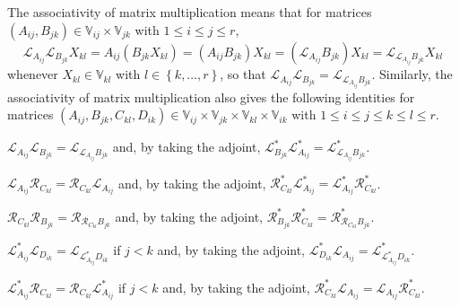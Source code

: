 \documentclass[oneside]{amsart}
\theoremstyle{plain}
\theoremstyle{definition}
\theoremstyle{remark}
\numberwithin{equation}{section}
\begin{document}
The associativity of matrix multiplication means that for matrices
$(A_{ij}, B_{jk}) \in \mathbb{V}_{ij} \times \mathbb{V}_{jk}$ with $1 \leq
i \leq j \leq r$,
\[
\mathcal{L}_{A_{ij}} \mathcal{L}_{B_{jk}} X_{kl} = A_{ij} (B_{jk} X_{kl}) =
(A_{ij} B_{jk}) X_{kl} = (\mathcal{L}_{A_{ij}} B_{jk}) X_{kl} =
\mathcal{L}_{\mathcal{L}_{A_{ij}} B_{jk}} X_{kl}
\]
whenever $X_{kl} \in \mathbb{V}_{kl}$ with $l \in \left\{k, \dotsc,
r\right\}$, so that $\mathcal{L}_{A_{ij}} \mathcal{L}_{B_{jk}} =
\mathcal{L}_{\mathcal{L}_{A_{ij}} B_{jk}}$. Similarly, the associativity of
matrix multiplication also gives the following identities for matrices
$(A_{ij}, B_{jk}, C_{kl}, D_{ik}) \in \mathbb{V}_{ij} \times
\mathbb{V}_{jk} \times \mathbb{V}_{kl} \times \mathbb{V}_{ik}$ with $1 \leq
i \leq j \leq k \leq l \leq r$.
\begin{enumerate}[label={[\Alph*]},
ref={[\Alph*]}]
\item\label{identity:leftleft}%
$\mathcal{L}_{A_{ij}} \mathcal{L}_{B_{jk}} =
\mathcal{L}_{\mathcal{L}_{A_{ij}} B_{jk}}$ and, by taking the adjoint,
$\mathcal{L}^{*}_{B_{jk}} \mathcal{L}^{*}_{A_{ij}} =
\mathcal{L}^{*}_{\mathcal{L}_{A_{ij}} B_{jk}}$.

\item\label{identity:leftright}%
$\mathcal{L}_{A_{ij}} \mathcal{R}_{C_{kl}} = \mathcal{R}_{C_{kl}}
\mathcal{L}_{A_{ij}}$ and, by taking the adjoint, $\mathcal{R}^{*}_{C_{kl}}
\mathcal{L}^{*}_{A_{ij}} = \mathcal{L}^{*}_{A_{ij}}
\mathcal{R}^{*}_{C_{kl}}$.

\item\label{identity:rightright}%
$\mathcal{R}_{C_{kl}} \mathcal{R}_{B_{jk}} =
\mathcal{R}_{\mathcal{R}_{C_{kl}} B_{jk}}$ and, by taking the adjoint,
$\mathcal{R}^{*}_{B_{jk}} \mathcal{R}^{*}_{C_{kl}} =
\mathcal{R}^{*}_{\mathcal{R}_{C_{kl}} B_{jk}}$.

\item\label{identity:leftadjointleft}%
$\mathcal{L}^{*}_{A_{ij}} \mathcal{L}_{D_{ik}} =
\mathcal{L}_{\mathcal{L}^{*}_{A_{ij}} D_{ik}}$ if $j < k$ and, by taking
the adjoint, $\mathcal{L}^{*}_{D_{ik}} \mathcal{L}_{A_{ij}} =
\mathcal{L}^{*}_{\mathcal{L}^{*}_{A_{ij}} D_{ik}}$.

\item\label{identity:leftadjointright}%
$\mathcal{L}^{*}_{A_{ij}} \mathcal{R}_{C_{kl}} = \mathcal{R}_{C_{kl}}
\mathcal{L}^{*}_{A_{ij}}$ if $j < k$ and, by taking the adjoint,
$\mathcal{R}^{*}_{C_{kl}} \mathcal{L}_{A_{ij}} = \mathcal{L}_{A_{ij}}
\mathcal{R}^{*}_{C_{kl}}$.

\end{enumerate}
\end{document}
